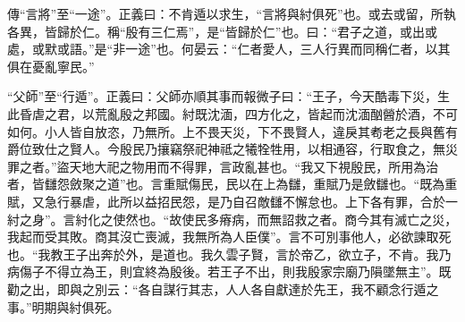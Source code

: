 {\noindent\zhuan{}\fzbyks 傳“言將”至“一途”。正義曰：不肯遁以求生，“言將與紂俱死”也。或去或留，所執各異，皆歸於仁。稱“殷有三仁焉”，是“皆歸於仁”也。曰：“君子之道，或出或處，或默或語。”是“非一途”也。何晏云：“仁者愛人，三人行異而同稱仁者，以其俱在憂亂寧民。” \par}

{\noindent\shu{}\fzkt “父師”至“行遁”。正義曰：父師亦順其事而報微子曰：“王子，今天酷毒下災，生此昏虐之君，以荒亂殷之邦國。紂既沈湎，四方化之，皆起而沈湎酗醟於酒，不可如何。小人皆自放恣，乃無所。上不畏天災，下不畏賢人，違戾其耇老之長與舊有爵位致仕之賢人。今殷民乃攘竊祭祀神祗之犧牷牲用，以相通容，行取食之，無災罪之者。”盜天地大祀之物用而不得罪，言政亂甚也。“我又下視殷民，所用為治者，皆讎怨斂聚之道”也。言重賦傷民，民以在上為讎，重賦乃是斂讎也。“既為重賦，又急行暴虐，此所以益招民怨，是乃自召敵讎不懈怠也。上下各有罪，合於一紂之身”。言紂化之使然也。“故使民多瘠病，而無詔救之者。商今其有滅亡之災，我起而受其敗。商其沒亡喪滅，我無所為人臣僕”。言不可別事他人，必欲諫取死也。“我教王子出奔於外，是道也。我久雲子賢，言於帝乙，欲立子，不肯。我乃病傷子不得立為王，則宜終為殷後。若王子不出，則我殷家宗廟乃隕墜無主”。既勸之出，即與之別云：“各自謀行其志，人人各自獻達於先王，我不顧念行遁之事。”明期與紂俱死。 \par}

